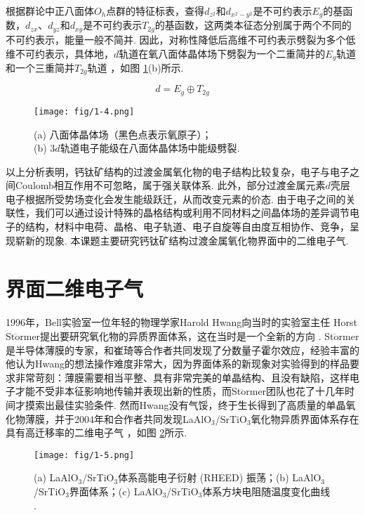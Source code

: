 \documentclass[12pt,a4paper,openany,twoside,UTF-8]{book}
\begin{document}
根据群论中正八面体$O_h$点群的特征标表，查得$d_{z^2}$和$d_{x^2-y^2}$是不可约表示$E_g$的基函数，$d_{zx}$、$d_{yz}$和$d_{xy}$是不可约表示$T_{2g}$的基函数，这两类本征态分别属于两个不同的不可约表示，能量一般不简并. 因此，对称性降低后高维不可约表示劈裂为多个低维不可约表示，具体地，$d$轨道在氧八面体晶体场下劈裂为一个二重简并的$E_g$轨道和一个三重简并$T_{2g}$轨道 \cite{ref5}，如图 \ref{fig:1-4}(b)所示.

$$d=E_g\oplus T_{2g}$$

\begin{figure}[htbp]
\centering
\texttt{[image: fig/1-4.png]}
\caption{(a) 八面体晶体场（黑色点表示氧原子）；\\(b) 3$d$轨道电子能级在八面体晶体场中能级劈裂\cite{ref4}.}
\label{fig:1-4} 
\end{figure}

以上分析表明，钙钛矿结构的过渡金属氧化物的电子结构比较复杂，电子与电子之间Coulomb相互作用不可忽略，属于强关联体系. 此外，部分过渡金属元素$d$壳层电子根据所受势场变化会发生能级跃迁，从而改变元素的价态. 由于电子之间的关联性，我们可以通过设计特殊的晶格结构或利用不同材料之间晶体场的差异调节电子的结构，材料中电荷、晶格、电子轨道、电子自旋等自由度互相协作、竞争，呈现崭新的现象. 本课题主要研究钙钛矿结构过渡金属氧化物界面中的二维电子气.

\section{界面二维电子气}
1996年，Bell实验室一位年轻的物理学家Harold Hwang向当时的实验室主任 Horst St$\ddot{\mathrm{o}}$rmer提出要研究氧化物的异质界面体系，这在当时是一个全新的方向 \cite{ref6}. St$\ddot{\mathrm{o}}$rmer 是半导体薄膜的专家，和崔琦等合作者共同发现了分数量子霍尔效应，经验丰富的他认为Hwang的想法操作难度非常大，因为界面体系的新现象对实验得到的样品要求非常苛刻：薄膜需要相当平整、具有非常完美的单晶结构、且没有缺陷，这样电子才能不受非本征影响地传输并表现出新的性质，而St$\ddot{\mathrm{o}}$rmer团队也花了十几年时间才摸索出最佳实验条件. 然而Hwang没有气馁，终于生长得到了高质量的单晶氧化物薄膜，并于2004年和合作者共同发现LaAlO$_3$/SrTiO$_3$氧化物异质界面体系存在具有高迁移率的二维电子气 \cite{ref7}，如图 \ref{fig:1-5}所示. 

\begin{figure}[htbp]
\centering
\texttt{[image: fig/1-5.png]}
\caption{(a) LaAlO$_3$/SrTiO$_3$体系高能电子衍射 (RHEED) 振荡；(b) LaAlO$_3$/SrTiO$_3$界面体系；(c) LaAlO$_3$/SrTiO$_3$体系方块电阻随温度变化曲线 \cite{ref7}.}
\label{fig:1-5} 
\end{figure}
\end{document}
